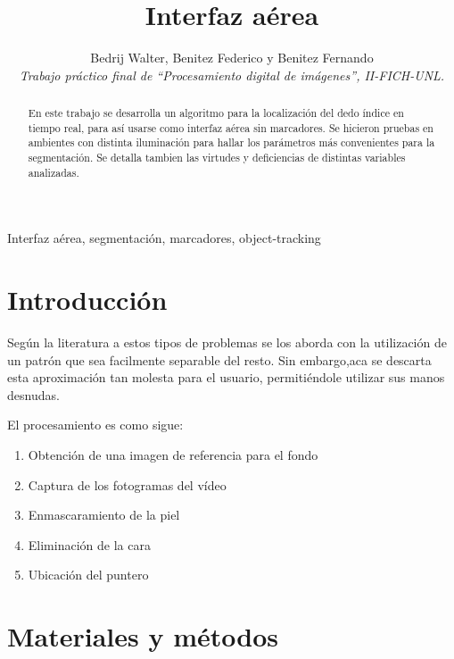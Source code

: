 \documentclass[conference,a4paper,10pt,oneside,final]{tfmpd}
\begin{document}
	\title{Interfaz aérea}
	\author{Bedrij Walter, Benitez Federico y Benitez Fernando \\
	\textit{Trabajo práctico final de ``Procesamiento digital de imágenes'', II-FICH-UNL.}}
	\date{}

	\maketitle

    \begin{abstract}
   	 En este trabajo se desarrolla un algoritmo para la localización
   	 del dedo índice en tiempo real,
   	 para así usarse como interfaz aérea sin marcadores.
   	 Se hicieron pruebas en ambientes con distinta iluminación
   	 para hallar los parámetros más convenientes para la segmentación.
   	 Se detalla tambien las virtudes y deficiencias de distintas variables analizadas.

    \end{abstract}
	\begin{keywords}
		 Interfaz aérea, segmentación, marcadores, object-tracking
	\end{keywords}

    \section{Introducción}
   	 Según la literatura a estos tipos de problemas se los aborda
   	 con la utilización de un patrón que sea facilmente separable del resto.
   	 Sin embargo,aca se descarta esta aproximación tan molesta para el usuario,
   	 permitiéndole utilizar sus manos desnudas.

   	 El procesamiento es como sigue:
   	 \begin{enumerate}
   		 \item Obtención de una imagen de referencia para el fondo
   		 \item Captura de los fotogramas del vídeo
   		 \item Enmascaramiento de la piel
   		 \item Eliminación de la cara
   		 \item Ubicación del puntero
   	 \end{enumerate}

    \section{Materiales y métodos}
\end{document}
